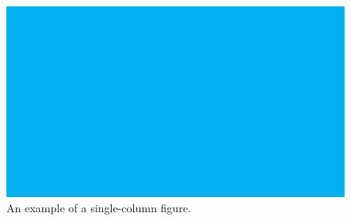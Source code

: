 \begin{figure}[h!]
  \centering
  \includegraphics[width=.9\columnwidth]{fig/fig1.pdf}
  \caption{An example of a single-column figure.}
  \label{fig:single}
\end{figure}
